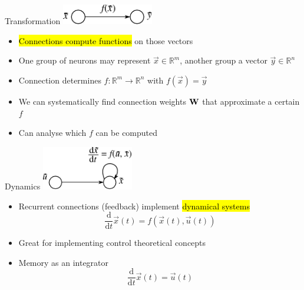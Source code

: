 \documentclass[handout,aspectratio=169]{beamer}
\begin{document}
\begin{frame}{Transformation}
	\vspace{0.25cm}
	\centering
	\includegraphics[width=0.3\textwidth]{media/network.pdf}\\[0.5cm]
	\begin{itemize}
		\setlength{\itemsep}{0.25cm}
		\item \hl{Connections compute functions} on those vectors
		\item<2-> One group of neurons may represent $\vec x \in \mathbb{R}^m$, another group a vector $\vec y \in \mathbb{R}^n$
		\item<3-> Connection determines $f : \mathbb{R}^m \rightarrow \mathbb{R}^n$ with $f(\vec x) = \vec y$
		\item<4-> We can systematically find connection weights ${\mathbf{W}}$ that approximate a certain $f$
		\item<5-> Can analyse which $f$ can be computed
	\end{itemize}
\end{frame}

\begin{frame}{Dynamics}
	\vspace{0.25cm}
	\centering
	\includegraphics[width=0.3\textwidth]{media/network_dynamics.pdf}\\[0.5cm]
	\begin{itemize}
		\setlength{\itemsep}{0.25cm}
		\item Recurrent connections (feedback) implement \hl{dynamical systems}
		$$\frac{\mathrm{d}}{\mathrm{d}t} \vec x(t) = f(\vec x(t), \vec u(t))$$
		\item<2-> Great for implementing control theoretical concepts
		\item<3-> Memory as an integrator $$\frac{\mathrm{d}}{\mathrm{d}t} \vec x(t) = \vec u(t)$$
	\end{itemize}
\end{frame}
\end{document}

